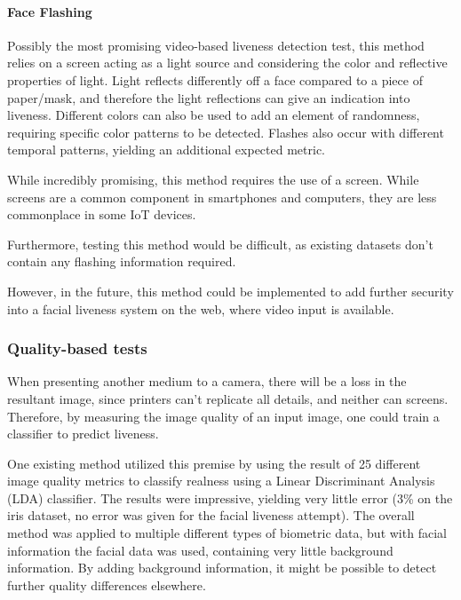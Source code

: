\documentclass[12pt,a4paper]{article}
\begin{document}
        \paragraph{Face Flashing}
        Possibly the most promising video-based liveness detection test, this method relies on a screen acting as a light source and considering the color and reflective properties of light. Light reflects differently off a face compared to a piece of paper/mask, and therefore the light reflections can give an indication into liveness. Different colors can also be used to add an element of randomness, requiring specific color patterns to be detected. Flashes also occur with different temporal patterns, yielding an additional expected metric.

        While incredibly promising, this method requires the use of a screen. While screens are a common component in smartphones and computers, they are less commonplace in some IoT devices. 

        Furthermore, testing this method would be difficult, as existing datasets don't contain any flashing information required. 

        However, in the future, this method could be implemented to add further security into a facial liveness system on the web, where video input is available.
        
        \subsubsection{Quality-based tests}
        When presenting another medium to a camera, there will be a loss in the resultant image, since printers can't replicate all details, and neither can screens. Therefore, by measuring the image quality of an input image, one could train a classifier to predict liveness.

        One existing method utilized this premise by using the result of 25 different image quality metrics to classify realness using a Linear Discriminant Analysis (LDA) classifier. The results were impressive, 
        yielding very little error (3\% on the iris dataset, no error was given for the facial liveness attempt). The overall method was applied to multiple different types of biometric data, but with facial information the facial data was used, containing very little background information. \cite{ImageQualityAssessmentTest}
        By adding background information, it might be possible to detect further quality differences elsewhere. 
        
\end{document}
